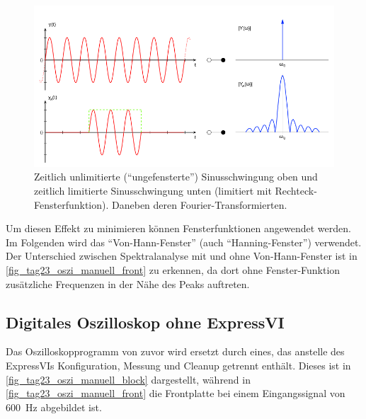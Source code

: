 \documentclass[
a4paper,
12pt,
pagesize,
ngerman
]{scrartcl}
\begin{document}
	\begin{figure}[H]  
		\includegraphics[width=1\textwidth]{EIRE2018Dateien/sonstige_Dateien/leakage}
		\centering
		\caption{
			Zeitlich unlimitierte (\enquote{ungefensterte}) Sinusschwingung oben und zeitlich limitierte Sinusschwingung unten (limitiert mit Rechteck-Fensterfunktion). Daneben deren Fourier-Transformierten. \cite{Leakage} %
		}
		\label{fig_leakage_veranschaulichung}
		\centering
	\end{figure}

	Um diesen Effekt zu minimieren können Fensterfunktionen angewendet werden. %
	Im Folgenden wird das \enquote{Von-Hann-Fenster} (auch \enquote{Hanning-Fenster}) verwendet. %
	Der Unterschied zwischen Spektralanalyse mit und ohne Von-Hann-Fenster ist in \cref{fig_tag23_oszi_manuell_front} zu erkennen, da dort ohne Fenster-Funktion zusätzliche Frequenzen in der Nähe des Peaks auftreten.
	

	\subsection{Digitales Oszilloskop ohne ExpressVI} %
	Das Oszilloskopprogramm von zuvor wird ersetzt durch eines, das anstelle des ExpressVIs Konfiguration, Messung und Cleanup getrennt enthält.
	Dieses ist in \cref{fig_tag23_oszi_manuell_block} dargestellt, während in \cref{fig_tag23_oszi_manuell_front} die Frontplatte bei einem Eingangssignal von \SI{600}{\hertz} abgebildet ist.
	
\end{document}
